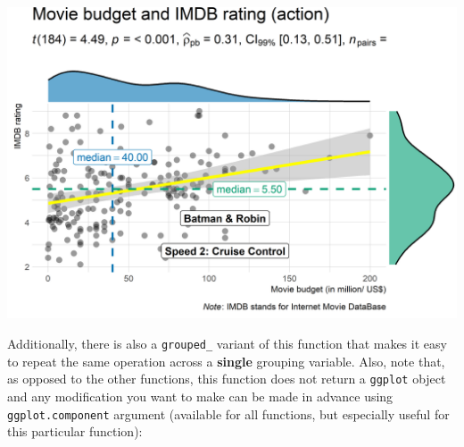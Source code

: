 \documentclass[
]{article}
\begin{document}
\includegraphics[width=1\linewidth]{./figures/paper-ggscatterstats2-1}

Additionally, there is also a \texttt{grouped\_} variant of this function that makes it
easy to repeat the same operation across a \textbf{single} grouping variable. Also,
note that, as opposed to the other functions, this function does not return a
\texttt{ggplot} object and any modification you want to make can be made in advance
using \texttt{ggplot.component} argument (available for all functions, but especially
useful for this particular function):
\end{document}
